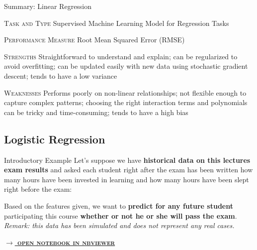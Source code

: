 \documentclass[document.tex]{subfiles}
\begin{document}
    \begin{frame}{Summary: Linear Regression}
        \begin{alertblock}{\textsc{Task and Type}}
            Supervised Machine Learning Model for Regression Tasks
        \end{alertblock}
        \begin{alertblock}{\textsc{Performance Measure}}
            Root Mean Squared Error (RMSE)
        \end{alertblock}
        \begin{alertblock}{\textsc{Strengths}}
            Straightforward to understand and explain; can be regularized to avoid overfitting; can be updated easily with new data using stochastic gradient descent; tends to have a low variance
        \end{alertblock}
        \begin{alertblock}{\textsc{Weaknesses}}
            Performs poorly on non-linear relationships; not flexible enough to capture complex patterns; choosing the right interaction terms and polynomials can be tricky and time-consuming; tends to have a high bias
        \end{alertblock}
    \end{frame}
    
    \subsection{Logistic Regression}
    
    \begin{frame}{Introductory Example}
        Let's suppose we have \textbf{historical data on this lectures exam results} and asked each student right after the exam has been written how many hours have been invested in learning and how many hours have been slept right before the exam:
           
        \begin{table}
            \scalebox{0.9}{}
        \end{table}
    
        Based on the features given, we want to \textbf{predict for any future student} participating this course \textbf{whether or not he or she will pass the exam}. \textit{Remark: this data has been simulated and does not represent any real cases.}
        
        \small{\href{https://nbviewer.jupyter.org/github/saschaschworm/big-data-and-data-science/blob/master/notebooks/demos/exam-performance-logistic-regression.ipynb}{\textsc{\textbf{$\rightarrow$ open notebook in nbviewer}}}}
    \end{frame}
\end{document}
